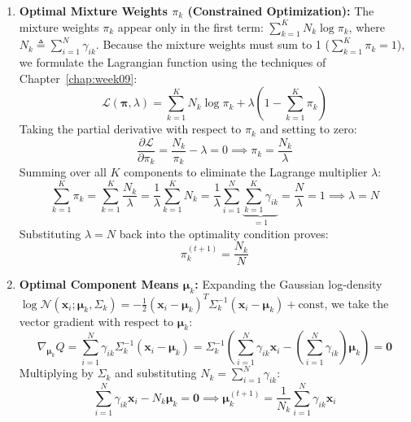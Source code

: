 \begin{enumerate}
    \item \textbf{Optimal Mixture Weights $\pi_k$ (Constrained Optimization):}
    The mixture weights $\pi_k$ appear only in the first term: $\sum_{k=1}^K N_k \log \pi_k$, where $N_k \triangleq \sum_{i=1}^N \gamma_{ik}$. Because the mixture weights must sum to 1 ($\sum_{k=1}^K \pi_k = 1$), we formulate the Lagrangian function using the techniques of Chapter~\ref{chap:week09}:
    \begin{equation}
    \mathcal{L}(\boldsymbol{\pi}, \lambda) = \sum_{k=1}^K N_k \log \pi_k + \lambda\left( 1 - \sum_{k=1}^K \pi_k \right)
    \end{equation}
    Taking the partial derivative with respect to $\pi_k$ and setting to zero:
    \begin{equation}
    \frac{\partial \mathcal{L}}{\partial \pi_k} = \frac{N_k}{\pi_k} - \lambda = 0 \implies \pi_k = \frac{N_k}{\lambda}
    \end{equation}
    Summing over all $K$ components to eliminate the Lagrange multiplier $\lambda$:
    \begin{equation}
    \sum_{k=1}^K \pi_k = \sum_{k=1}^K \frac{N_k}{\lambda} = \frac{1}{\lambda}\sum_{k=1}^K N_k = \frac{1}{\lambda}\sum_{i=1}^N \underbrace{\sum_{k=1}^K \gamma_{ik}}_{= 1} = \frac{N}{\lambda} = 1 \implies \lambda = N
    \end{equation}
    Substituting $\lambda = N$ back into the optimality condition proves:
    \begin{equation}
    \pi_k^{(t+1)} = \frac{N_k}{N}
    \end{equation}

    \item \textbf{Optimal Component Means $\boldsymbol{\mu}_k$:}
    Expanding the Gaussian log-density $\log \mathcal{N}(\mathbf{x}_i; \boldsymbol{\mu}_k, \Sigma_k) = -\frac{1}{2}(\mathbf{x}_i - \boldsymbol{\mu}_k)^T \Sigma_k^{-1}(\mathbf{x}_i - \boldsymbol{\mu}_k) + \text{const}$, we take the vector gradient with respect to $\boldsymbol{\mu}_k$:
    \begin{equation}
    \nabla_{\boldsymbol{\mu}_k} Q = \sum_{i=1}^N \gamma_{ik} \Sigma_k^{-1} (\mathbf{x}_i - \boldsymbol{\mu}_k) = \Sigma_k^{-1} \left( \sum_{i=1}^N \gamma_{ik}\mathbf{x}_i - \left(\sum_{i=1}^N \gamma_{ik}\right)\boldsymbol{\mu}_k \right) = \mathbf{0}
    \end{equation}
    Multiplying by $\Sigma_k$ and substituting $N_k = \sum_{i=1}^N \gamma_{ik}$:
    \begin{equation}
    \sum_{i=1}^N \gamma_{ik}\mathbf{x}_i - N_k \boldsymbol{\mu}_k = \mathbf{0} \implies \boldsymbol{\mu}_k^{(t+1)} = \frac{1}{N_k}\sum_{i=1}^N \gamma_{ik}\mathbf{x}_i
    \end{equation}


\end{enumerate}
